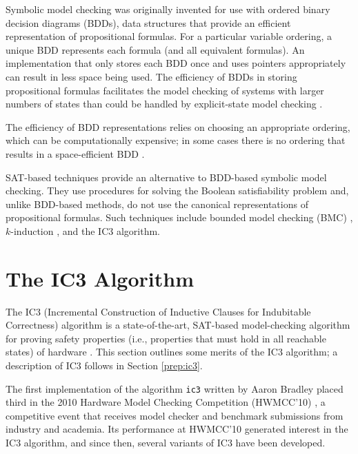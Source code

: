 \documentclass[12pt,a4paper,twoside,openright]{report}
\begin{document}
Symbolic model checking was originally invented for use with ordered
binary decision diagrams (BDDs), data structures that provide an efficient
representation of propositional formulas. For a particular variable
ordering, a unique BDD represents each formula (and all equivalent formulas).
An implementation that only stores each BDD once and uses pointers appropriately
can result in less space being used.
The efficiency of BDDs in storing propositional formulas facilitates the model
checking of systems with larger numbers of states than could be handled
by explicit-state model checking \cite{mcmillan92}.

The efficiency of BDD representations relies on choosing an appropriate
ordering, which can be computationally expensive; in some cases
there is no ordering that results in a space-efficient BDD
\cite{biere99a}.

SAT-based techniques provide an alternative to BDD-based symbolic model checking.
They use procedures for solving the Boolean satisfiability
problem and, unlike BDD-based methods, do not use the canonical representations
of propositional formulas.
Such techniques include bounded model checking (BMC)
\cite{biere99a}, $k$-induction \cite{sheeran00},
and the IC3 algorithm.


\section{The IC3 Algorithm}


The IC3 (Incremental Construction of Inductive Clauses for Indubitable Correctness)
algorithm is a state-of-the-art,
SAT-based model-checking
algorithm for proving safety properties (i.e., properties that must hold
in all reachable states) of hardware \cite{bradley11}. This section outlines some
merits of the IC3 algorithm; a description of IC3 follows in Section
\ref{prep:ic3}.

The first implementation of the algorithm \verb,ic3, written by Aaron Bradley placed third in
the 2010 Hardware Model Checking Competition (HWMCC'10) \cite{hwmcc10},
a competitive event that receives model checker and benchmark submissions from
industry and
academia. Its performance at HWMCC'10 generated interest in the IC3 algorithm, and
since then, several variants of IC3 have been developed.
\end{document}

